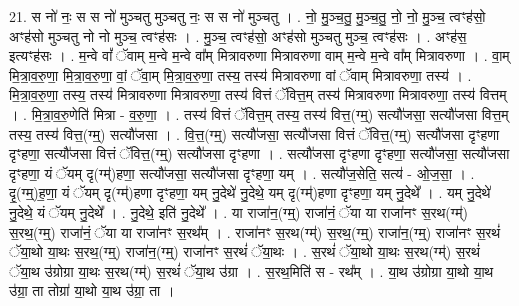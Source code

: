 \documentclass[17pt]{extarticle}
\begin{document}
21. स नो॑ नः॒ स स नो॑ मुञ्चतु मुञ्चतु नः॒ स स नो॑ मुञ्चतु । . नो॒ मु॒ञ्च॒तु॒ मु॒ञ्च॒तु॒ नो॒ नो॒ मु॒ञ्च॒ त्वꣳह॑सो॒ अꣳह॑सो मुञ्चतु नो नो मुञ्च॒ त्वꣳह॑सः । . मु॒ञ्च॒ त्वꣳह॑सो॒ अꣳह॑सो मुञ्चतु मुञ्च॒ त्वꣳह॑सः । . अꣳह॑स॒ इत्यꣳह॑सः । . म॒न्वे वां᳚ ॅवाम् म॒न्वे म॒न्वे वा᳚म् मित्रावरुणा मित्रावरुणा वाम् म॒न्वे म॒न्वे वा᳚म् मित्रावरुणा । . वा॒म् मि॒त्रा॒व॒रु॒णा॒ मि॒त्रा॒व॒रु॒णा॒ वां॒ ॅवा॒म् मि॒त्रा॒व॒रु॒णा॒ तस्य॒ तस्य॑ मित्रावरुणा वां ॅवाम् मित्रावरुणा॒ तस्य॑ । . मि॒त्रा॒व॒रु॒णा॒ तस्य॒ तस्य॑ मित्रावरुणा मित्रावरुणा॒ तस्य॑ वित्तं ॅवित्त॒म् तस्य॑ मित्रावरुणा मित्रावरुणा॒ तस्य॑ वित्तम् । . मि॒त्रा॒व॒रु॒णेति॑ मित्रा - व॒रु॒णा॒ । . तस्य॑ वित्तं ॅवित्त॒म् तस्य॒ तस्य॑ वित्त॒(ग्म्॒) सत्यौ॑जसा॒ सत्यौ॑जसा वित्त॒म् तस्य॒ तस्य॑ वित्त॒(ग्म्॒) सत्यौ॑जसा । . वि॒त्त॒(ग्म्॒) सत्यौ॑जसा॒ सत्यौ॑जसा वित्तं ॅवित्त॒(ग्म्॒) सत्यौ॑जसा दृꣳहणा दृꣳहणा॒ सत्यौ॑जसा वित्तं ॅवित्त॒(ग्म्॒) सत्यौ॑जसा दृꣳहणा । . सत्यौ॑जसा दृꣳहणा दृꣳहणा॒ सत्यौ॑जसा॒ सत्यौ॑जसा दृꣳहणा॒ यं ॅयम् दृ(ग्म्॑)हणा॒ सत्यौ॑जसा॒ सत्यौ॑जसा दृꣳहणा॒ यम् । . सत्यौ॑ज॒सेति॒ सत्य॑ - ओ॒ज॒सा॒ । . दृ॒(ग्म्॒)ह॒णा॒ यं ॅयम् दृ(ग्म्॑)हणा दृꣳहणा॒ यम् नु॒देथे॑ नु॒देथे॒ यम् दृ(ग्म्॑)हणा दृꣳहणा॒ यम् नु॒देथे᳚ । . यम् नु॒देथे॑ नु॒देथे॒ यं ॅयम् नु॒देथे᳚ । . नु॒देथे॒ इति॑ नु॒देथे᳚ । . या राजा॑न॒(ग्म्॒) राजा॑नं॒ ॅया या राजा॑नꣳ स॒रथ(ग्म्॑) स॒रथ॒(ग्म्॒) राजा॑नं॒ ॅया या राजा॑नꣳ स॒रथ᳚म् । . राजा॑नꣳ स॒रथ(ग्म्॑) स॒रथ॒(ग्म्॒) राजा॑न॒(ग्म्॒) राजा॑नꣳ स॒रथं॑ ॅया॒थो या॒थः स॒रथ॒(ग्म्॒) राजा॑न॒(ग्म्॒) राजा॑नꣳ स॒रथं॑ ॅया॒थः । . स॒रथं॑ ॅया॒थो या॒थः स॒रथ(ग्म्॑) स॒रथं॑ ॅया॒थ उ॑ग्रोग्रा या॒थः स॒रथ(ग्म्॑) स॒रथं॑ ॅया॒थ उ॑ग्रा । . स॒रथ॒मिति॑ स - रथ᳚म् । . या॒थ उ॑ग्रोग्रा या॒थो या॒थ उ॑ग्रा॒ ता तोग्रा॑ या॒थो या॒थ उ॑ग्रा॒ ता । \newline
\end{document}
